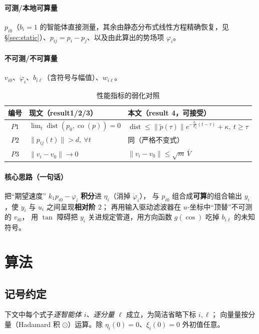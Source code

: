 \documentclass[11pt,a4paper]{article}
\newcommand{\dist}{\operatorname{dist}}
\newcommand{\co}{\operatorname{co}}
\theoremstyle{plain}
\theoremstyle{definition}
\theoremstyle{remark}
\begin{document}
\paragraph{可测/本地可算量}
$p_{i0}$（$b_i=1$ 的智能体直接测量，其余由静态分布式线性方程精确恢复，见
§\ref{sec:static}）、$p_{ij}=p_i-p_j$、以及由此算出的势场项 $\varphi_i$。

\paragraph{不可测/不可算量}
$v_{i0}$、$\dot\varphi_i$、$b_{i\ell}$（含符号与幅值）、$w_{i\ell}$。

\begin{table}[H]
\centering
\caption{性能指标的弱化对照}
\begin{tabular}{c|p{6.1cm}|p{6.1cm}}
\hline
编号 & 现文（result1/2/3） & 本文（result 4，可接受）\\
\hline
$P1$ & $\lim_{t}\dist(p_0,\co(p))=0$ &
$\dist\le\|\tilde p(\tau)\|e^{-\frac{k_1}{k_2}(t-\tau)}+\kappa,\ t\ge\tau$\\
\hline
$P2$ & $\|p_{ij}(t)\|>d,\ \forall t$ & 同（严格不变式）\\
\hline
$P3$ & $\|v_i-v_0\|\to0$ & $\|v_i-v_0\|\le\sqrt m\,\bar V$\\
\hline
\end{tabular}
\end{table}

\paragraph{核心思路（一句话）}
把“期望速度” $k_1p_{i0}-\varphi_i$ \textbf{积分}进 $\eta_i$（消掉 $\dot\varphi_i$），
与 $p_{i0}$ 组合成\textbf{可算}的组合输出 $y_i$，使 $y_i$ 与 $u_i$ 之间呈现\textbf{相对阶 $2$}；
再用输入驱动滤波器在 $u$-坐标中“顶替”不可测的 $v_{i0}$，
用 $\tan$ 障碍把 $y_i$ 关进规定管道，用方向函数 $g(\cos)$ 吃掉 $b_{i\ell}$ 的未知符号。

\section{算法}\label{sec:alg}
\subsection{记号约定}
下文中每个式子\emph{逐智能体 $i$、逐分量 $\ell$} 成立，为简洁省略下标 $i,\ell$；
向量量按分量（Hadamard 积 $\odot$）运算。除 $\eta_i(0)=0$、$\xi_i(0)=0$ 外初值任意。
\end{document}
